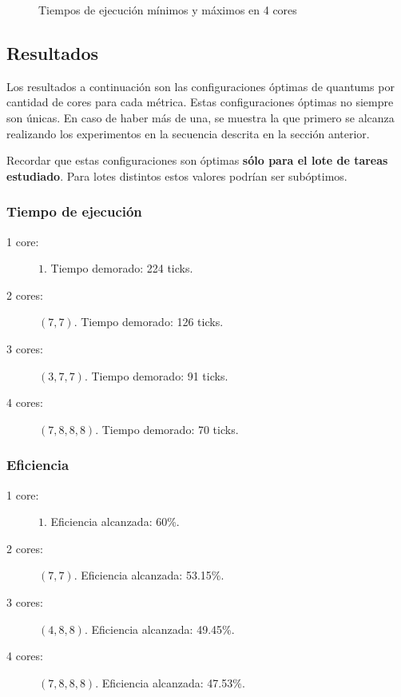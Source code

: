 \documentclass[a4paper,10pt,twoside]{article}
\begin{document}
\begin{figure}[H]
	\centering
	
	\caption{Tiempos de ejecución mínimos y máximos en 4 cores}
\end{figure}


\subsection{Resultados}

Los resultados a continuación son las configuraciones óptimas de quantums por cantidad de cores para cada métrica. Estas configuraciones óptimas no siempre son únicas. En caso de haber más de una, se muestra la que primero se alcanza realizando los experimentos en la secuencia descrita en la sección anterior.

Recordar que estas configuraciones son óptimas \textbf{sólo para el lote de tareas estudiado}. Para lotes distintos estos valores podrían ser subóptimos.


\subsubsection{Tiempo de ejecución}

\begin{description}
	\item[1 core:] $1$.             Tiempo demorado: 224 ticks.
	\item[2 cores:] $(7, 7)$.       Tiempo demorado: 126 ticks.
	\item[3 cores:] $(3, 7, 7)$.    Tiempo demorado: 91 ticks.
	\item[4 cores:] $(7, 8, 8, 8)$. Tiempo demorado: 70 ticks.
\end{description}


\subsubsection{Eficiencia}

\begin{description}
	\item[1 core:] $1$.             Eficiencia alcanzada: 60\%.
	\item[2 cores:] $(7, 7)$.       Eficiencia alcanzada: 53.15\%.
	\item[3 cores:] $(4, 8, 8)$.    Eficiencia alcanzada: 49.45\%.
	\item[4 cores:] $(7, 8, 8, 8)$. Eficiencia alcanzada: 47.53\%.
\end{description}
\end{document}

